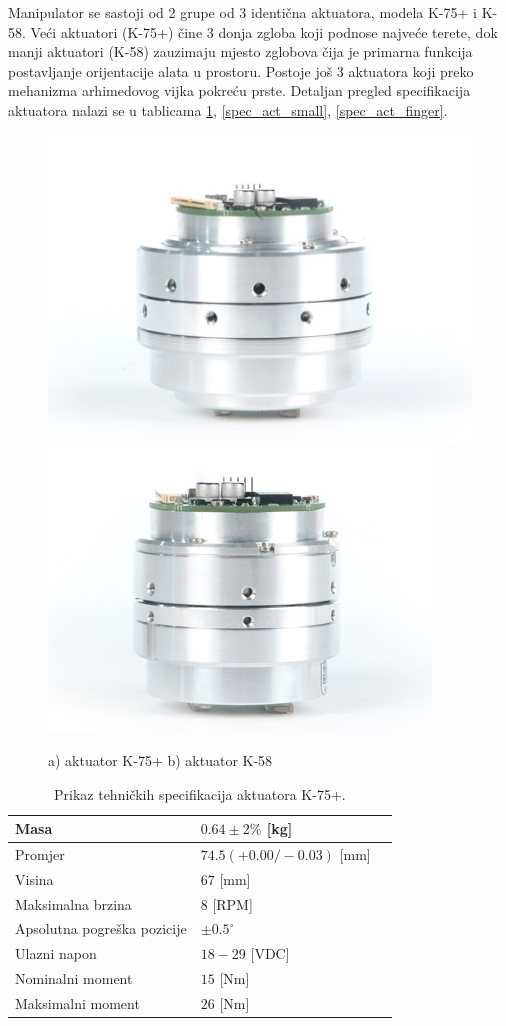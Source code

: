 \documentclass[times, utf8, diplomski, numeric]{fer}
\begin{document}
Manipulator se sastoji od 2 grupe od 3 identična aktuatora, modela K-75+ i K-58.
Veći aktuatori (K-75+) čine 3 donja zgloba koji podnose najveće terete, dok manji aktuatori (K-58) zauzimaju mjesto zglobova čija je primarna funkcija postavljanje orijentacije alata u prostoru.
Postoje još 3 aktuatora koji preko mehanizma arhimedovog vijka pokreću prste. 
Detaljan pregled specifikacija aktuatora nalazi se u tablicama \ref{spec_act_big}, \ref{spec_act_small}, \ref{spec_act_finger}.

\begin{figure}[h!]
\includegraphics[scale=0.5]{k75plus}
\includegraphics[scale=0.5]{k58}
\caption{a) aktuator K-75+ b) aktuator K-58}
\end{figure}

\begin{table}[h!]
    \centering
    \caption{Prikaz tehničkih specifikacija aktuatora K-75+.} \label{spec_act_big}
    \begin{tabular}{ | l | l | l |}
    \hline
    Masa & $0.64 \pm 2\%$ [kg] \\ \hline
    Promjer  & $74.5(+0.00/-0.03)$ [mm] \\ \hline
    Visina & $67$ [mm] \\ \hline
    Maksimalna brzina & $8$ [RPM] \\ \hline
    Apsolutna pogreška pozicije & $\pm0.5^{\circ}$ \\ \hline
    Ulazni napon  & $18 - 29$ [VDC] \\ \hline
    Nominalni moment & $15$ [Nm] \\ \hline
    Maksimalni moment & $26$  [Nm]  \\ \hline
    \end{tabular}
\end{table}
\end{document}
